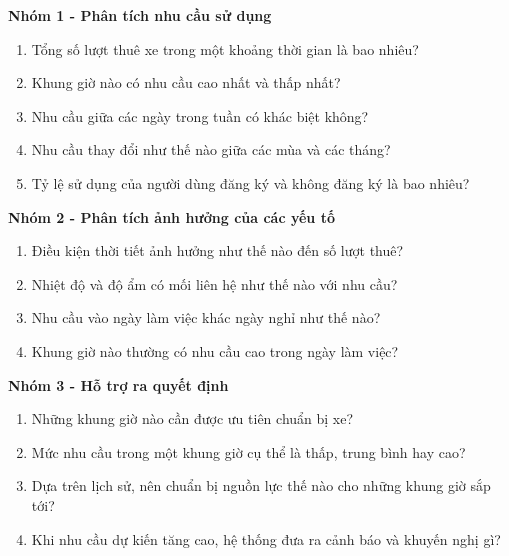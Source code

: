 \noindent\textbf{Nhóm 1 - Phân tích nhu cầu sử dụng}
\begin{enumerate}[label=Q1.\arabic*]
    \item Tổng số lượt thuê xe trong một khoảng thời gian là bao nhiêu?
    \item Khung giờ nào có nhu cầu cao nhất và thấp nhất?
    \item Nhu cầu giữa các ngày trong tuần có khác biệt không?
    \item Nhu cầu thay đổi như thế nào giữa các mùa và các tháng?
    \item Tỷ lệ sử dụng của người dùng đăng ký và không đăng ký là bao nhiêu?
\end{enumerate}
\noindent\textbf{Nhóm 2 - Phân tích ảnh hưởng của các yếu tố}
\begin{enumerate}[label=Q2.\arabic*]
    \item Điều kiện thời tiết ảnh hưởng như thế nào đến số lượt thuê?
    \item Nhiệt độ và độ ẩm có mối liên hệ như thế nào với nhu cầu?
    \item Nhu cầu vào ngày làm việc khác ngày nghỉ như thế nào?
    \item Khung giờ nào thường có nhu cầu cao trong ngày làm việc?
\end{enumerate}
\noindent\textbf{Nhóm 3 - Hỗ trợ ra quyết định}
\begin{enumerate}[label=Q3.\arabic*]
    \item Những khung giờ nào cần được ưu tiên chuẩn bị xe?
    \item Mức nhu cầu trong một khung giờ cụ thể là thấp, trung bình hay cao?
    \item Dựa trên lịch sử, nên chuẩn bị nguồn lực thế nào cho những khung giờ sắp tới?
    \item Khi nhu cầu dự kiến tăng cao, hệ thống đưa ra cảnh báo và khuyến nghị gì?
\end{enumerate}


